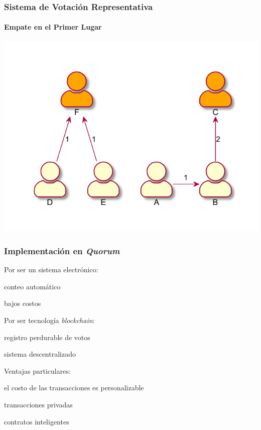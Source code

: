 \documentclass{beamer}
\begin{document}
\begin{frame}
    \frametitle{Sistema de Votaci\'on Representativa}
    \framesubtitle{Empate en el Primer Lugar}

    \includegraphics[scale=.9]{graphics/2-winners.pdf}
\end{frame}

\begin{frame}
    \frametitle{Implementaci\'on en \textit{Quorum}}



    \pause

    Por ser un sistema electrónico:
    \begin{adv}
        \item conteo autom\'atico
        \item bajos costos 
    \end{adv}

    \pause

    Por ser tecnología \textit{blockchain}:
    \begin{adv}
        \item registro perdurable de votos
        \item sistema descentralizado
    \end{adv}

    \pause

    Ventajas particulares:
    \begin{adv}
        \item el costo  de las transacciones es personalizable
        \item transacciones privadas
        \item contratos inteligentes 
    \end{adv}
\end{frame}
\end{document}

